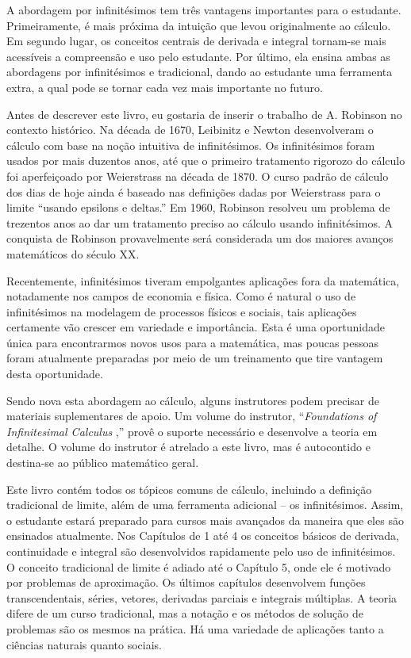 \documentclass{svmono}
\begin{document}
A abordagem por infinitésimos tem três vantagens importantes para o
estudante. Primeiramente, é mais próxima da intuição que levou originalmente
ao cálculo. Em segundo lugar, os conceitos centrais de derivada e integral
tornam-se mais acessíveis a compreensão e uso pelo estudante. Por último,
ela ensina ambas as abordagens por infinitésimos e tradicional, dando ao
estudante uma ferramenta extra, a qual pode se tornar cada vez mais
importante no futuro.

Antes de descrever este livro, eu gostaria de inserir o trabalho de A.
Robinson no contexto histórico. Na década de 1670, Leibinitz e Newton
desenvolveram o cálculo com base na noção intuitiva de infinitésimos.
Os infinitésimos foram usados por mais duzentos anos, até que o
primeiro tratamento rigorozo do cálculo foi aperfeiçoado por
Weierstrass na década de 1870. O curso padrão de cálculo dos dias
de hoje ainda é baseado nas definições dadas por Weierstrass para o limite
``usando epsilons e deltas.'' Em 1960, Robinson resolveu um
problema de trezentos anos ao dar um tratamento preciso ao cálculo
usando infinitésimos. A conquista de Robinson provavelmente será
considerada um dos maiores avanços matemáticos do século XX.

Recentemente, infinitésimos tiveram empolgantes aplicações fora
da matemática, notadamente nos campos de economia e física. Como
é natural o uso de infinitésimos na modelagem de processos físicos
e sociais, tais aplicações certamente vão crescer em variedade
e importância. Esta é uma oportunidade única para encontrarmos
novos usos para a matemática, mas poucas pessoas foram atualmente
preparadas por meio de um treinamento que tire vantagem desta
oportunidade.

Sendo nova esta abordagem ao cálculo, alguns instrutores podem
precisar de materiais suplementares de apoio. Um volume do instrutor,
``\emph{Foundations of Infinitesimal Calculus}%
%
,'' provê o suporte necessário e desenvolve a teoria em detalhe. O
volume do instrutor é atrelado a este livro, mas é autocontido
e destina-se ao público matemático geral.

Este livro contém todos os tópicos comuns de cálculo, incluindo a
definição tradicional de limite, além de uma ferramenta adicional
-- os infinitésimos. Assim, o estudante estará preparado para
cursos mais avançados da maneira que eles são ensinados atualmente.
Nos Capítulos de 1 até 4 os conceitos básicos de derivada, continuidade
e integral são desenvolvidos rapidamente pelo uso de infinitésimos. O
conceito tradicional de limite é adiado até o Capítulo 5, onde ele
é motivado por problemas de aproximação. Os últimos capítulos desenvolvem
funções transcendentais, séries, vetores, derivadas parciais e integrais
múltiplas. A teoria difere de um curso tradicional, mas a notação e os
métodos de solução de problemas são os mesmos na prática. Há uma variedade
de aplicações tanto a ciências naturais quanto sociais.
\end{document}
